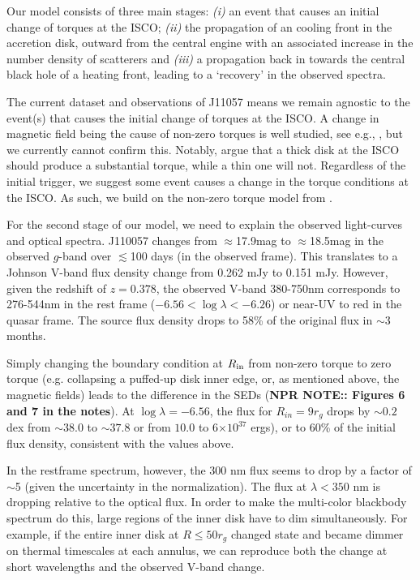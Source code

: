 



Our model consists of three main stages: {\it (i)} an event that causes
an initial change of torques at the ISCO; {\it (ii)} the propagation
of an cooling front in the accretion disk, outward from the central
engine with an associated increase in the number density of scatterers
and {\it (iii)} a propagation back in towards the central black hole of a
heating front, leading to a `recovery' in the observed spectra.

The current dataset and observations of J11057 means we remain agnostic to
the event(s) that causes the initial change of torques at the
ISCO.  A change in magnetic field being the cause of non-zero torques
is well studied, see e.g., \citet{Krolik1999, Gammie1999,
Agol_Krolik2000, Reynolds_Armitage2001}, but we currently 
cannot confirm this. Notably,
\citet{Afshordi_Paczynski2003} argue that a thick disk at the ISCO
should produce a substantial torque, while a thin one will not.
Regardless of the initial trigger, we suggest some event causes 
a change in the torque conditions at the ISCO. As such, we build 
on the non-zero torque model from \citet{Zimmerman2005}. 

For the second stage of our model, we need to explain the
observed light-curves and optical spectra. J110057 changes from
$\approx$17.9mag to $\approx$18.5mag in the observed $g$-band over
$\lesssim$100 days (in the observed frame).  This translates to a
Johnson V-band flux density change from 0.262 mJy to 0.151 mJy.
However, given the redshift of $z=0.378$, the observed V-band
380-750nm corresponds to 276-544nm in the rest frame ($-6.56 < \log
\lambda < -6.26$) or near-UV to red in the quasar frame. The source
flux density drops to 58\% of the original flux in $\sim$3 months.

Simply changing the boundary condition at $R_{\rm in}$ from non-zero
torque to zero torque (e.g. collapsing a puffed-up disk inner edge,
or, as mentioned above, the magnetic fields) leads to the difference
in the SEDs ({\bf NPR NOTE:: Figures 6 and 7 in the notes}).  At $\log
\lambda = −6.56$, the flux for $R_{in} = 9 r_{g}$ %
drops by $\sim0.2$ dex from $\sim38.0$ to $\sim37.8 $ or from $10.0$
to 6$\times 10^{37}$ ergs), or to 60\% of the initial flux density,
consistent with the values above.

In the restframe spectrum, however, the 300 nm flux seems to drop by a
factor of $\sim$5 (given the uncertainty in the normalization). The
flux at $\lambda < 350$ nm is dropping relative to the optical
flux. In order to make the multi-color blackbody spectrum do this, 
large regions of the  inner disk have to dim simultaneously. 
For example, if the entire inner disk at $R \leq 50 r_{g}$ changed state
and became dimmer on thermal timescales at each annulus, we can
reproduce both the change at short wavelengths and the observed V-band
change.


